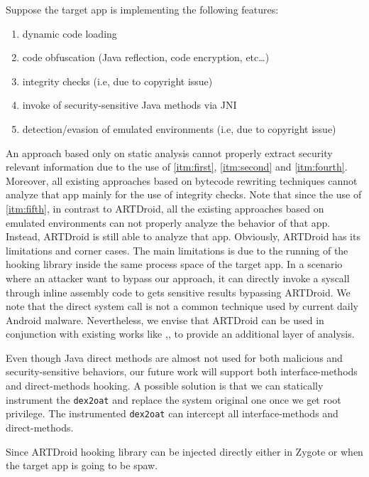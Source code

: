 Suppose the target app is implementing the following features:
\begin{enumerate}
\item \label{itm:first} dynamic code loading
\item\label{itm:second}  code obfuscation (Java reflection, code encryption, etc\ldots)
\item \label{itm:third} integrity checks (i.e, due to copyright issue)
\item \label{itm:fourth} invoke of security-sensitive Java methods via JNI
\item \label{itm:fifth} detection/evasion of emulated environments (i.e, due to copyright issue)
\end{enumerate}

An approach based only on static analysis cannot properly extract security relevant information due to the use of \ref{itm:first}, \ref{itm:second} and \ref{itm:fourth}. Moreover, all existing approaches based on bytecode rewriting techniques cannot analyze that app mainly for the use of integrity checks. Note that since the use of \ref{itm:fifth}, in contrast to ARTDroid, all the existing approaches based on emulated environments can not  properly analyze the behavior of that app. Instead, ARTDroid is still able to analyze that app. Obviously, ARTDroid has its limitations and corner cases. The main limitations is due to the running of the hooking library inside the same process space of the target app. In a scenario where an attacker want to bypass our approach, it can directly invoke a syscall through inline assembly code to gets sensitive results bypassing ARTDroid. We note that the direct system call is not a common technique used by current daily Android malware. Nevertheless, we envise that ARTDroid can be used in conjunction with existing works like \cite{tam2015copperdroid},\cite{zhauniarovich2015stadyna}, \cite{xu2012aurasium}  to provide an additional layer of analysis.



Even though Java direct methods are almost not used for both malicious and security-sensitive behaviors, our future work will support both interface-methods and direct-methods hooking. A possible solution is that we can statically instrument the  {\tt dex2oat} and replace the system original one once we get root privilege. The instrumented {\tt dex2oat} can intercept all interface-methods and direct-methods.

Since ARTDroid hooking library can be injected directly either in Zygote or when the target app is going to be spaw.


